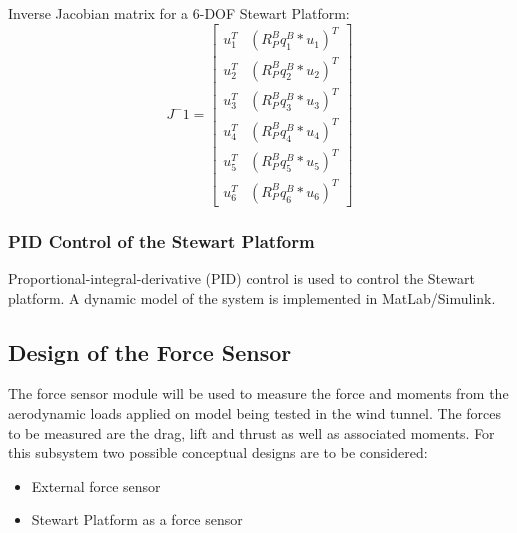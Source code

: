 Inverse Jacobian matrix for a 6-DOF Stewart Platform:
\[ J^-1 =
\begin{bmatrix}
u_{1}^{T} & (R_{P}^{B}q_{1}^{B} * u_{1})^T\\
u_{2}^{T} & (R_{P}^{B}q_{2}^{B} * u_{2})^T\\
u_{3}^{T} & (R_{P}^{B}q_{3}^{B} * u_{3})^T\\
u_{4}^{T} & (R_{P}^{B}q_{4}^{B} * u_{4})^T\\
u_{5}^{T} & (R_{P}^{B}q_{5}^{B} * u_{5})^T\\
u_{6}^{T} & (R_{P}^{B}q_{6}^{B} * u_{6})^T
\end{bmatrix}
\]
\subsubsection{PID Control of the Stewart Platform}
Proportional-integral-derivative (PID) control is used to control the Stewart platform. A dynamic model of the system is implemented in MatLab/Simulink.
\subsection{Design of the Force Sensor}
The force sensor module will be used to measure the force and moments from the aerodynamic loads applied on model being tested in the wind tunnel. The forces to be measured are the drag, lift and thrust as well as associated moments. For this subsystem two possible conceptual designs are to be considered:
\begin{itemize}
\item External force sensor
\item Stewart Platform as a force sensor
\end{itemize}
